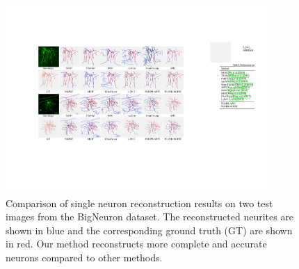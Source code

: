 \begin{figure}[th]
	\centering
	\includegraphics[width=0.9\textwidth]{./Illustrations/BigNeuron_comparison.pdf}
	\caption{Comparison of single neuron reconstruction results on two test images from the BigNeuron dataset.
		The reconstructed neurites are shown in blue and the corresponding ground truth (GT) are shown in red.
		Our method reconstructs more complete and accurate neurons compared to other methods.
	}
	\label{fig:compare_BigNeuron}
\end{figure}

